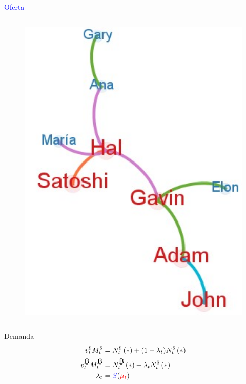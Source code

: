 \begin{frame}
\begin{columns}
\begin{column}{0.50\textwidth}
\begin{block}{\textcolor{blue}{Oferta}}
\begin{column}{0.35\textwidth}
\begin{figure}[H]
\begin{center}
             \includegraphics[width=1\textwidth]{images/C2/c2_simul_red5.jpg}
             \end{center}
            \end{figure}
            \end{column}
    \end{block}
    \begin{block}{\textcolor{dgreen}{Demanda}}
        \vspace{-10pt}
            \tiny
              \begin{align*}
              v_{t}^{\$}{M_{t}^{\$}}&={N_{t}^{\$}\left(*\right)}+(1-\lambda_t){N_{t}^{\$}\left(*\right)}\\
              v_{t}^{\bitcoinA}{M_{t}^{\bitcoinA}}&={N_{t}^{\bitcoinA}\left(*\right)+\lambda_tN_{t}^{\$}\left(*\right)}\\
              \lambda_t&=\textcolor{blue!70}{S}(\textcolor{red}{\mu_t})
            \end{align*}
    \vspace{-20pt}

\end{block}
\end{column}
\end{columns}
\end{frame}
